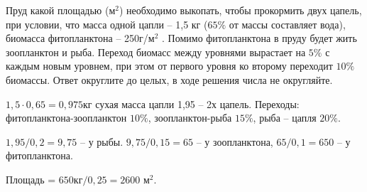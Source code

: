 
Пруд
какой площадью (м$^2$) необходимо выкопать, чтобы прокормить двух
цапель, при условии, что масса одной цапли – 1,5 кг ($65\%$ от массы составляет
вода), биомасса фитопланктона – 250г/м$^2$ . Помимо фитопланктона в
пруду будет жить зоопланктон и рыба. Переход биомасс между уровнями вырастает
на $5\%$ с каждым новым уровнем, при этом от первого уровня ко второму переходит
$10\%$ биомассы. Ответ округлите до целых, в ходе решения числа не округляйте.

\solutionSection

$1,5 \cdot 0,65=0,975$кг сухая масса цапли 1,95 – 2х цапель. 
Переходы: фитопланктона-зоопланктон $10\%$, зоопланктон-рыба $15\%$, рыба – цапля $20\%$. 

$1,95/0,2=9,75$ – у рыбы. $9,75/0,15 = 65$ – у зоопланктона, $65/0,1=650$ – у фитопланктона. 

Площадь = $650кг/0,25=2600$ м$^2$.

